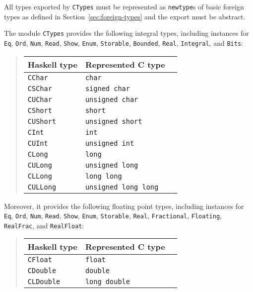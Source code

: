 \documentclass[a4paper,twoside]{article}
\newcommand{\code}[1]{\texttt{#1}}      %
\begin{document}
%
All types exported by \code{CTypes} must be represented as \code{newtype}s of
basic foreign types as defined in Section~\ref{sec:foreign-types} and the
export must be abstract.

The module \code{CTypes} provides the following integral types, including
instances for \code{Eq}, \code{Ord}, \code{Num}, \code{Read}, \code{Show},
\code{Enum}, \code{Storable}, \code{Bounded}, \code{Real}, \code{Integral},
and \code{Bits}:
%
\begin{quote}
  \begin{tabular}{|l|l|l|}
    \hline
    Haskell type     & Represented C type\\\hline\hline
    \code{CChar}     & \code{char}\\\hline
    \code{CSChar}    & \code{signed char}\\\hline
    \code{CUChar}    & \code{unsigned char}\\\hline
    \code{CShort}    & \code{short}\\\hline
    \code{CUShort}   & \code{unsigned short}\\\hline
    \code{CInt}      & \code{int}\\\hline
    \code{CUInt}     & \code{unsigned int}\\\hline
    \code{CLong}     & \code{long}\\\hline
    \code{CULong}    & \code{unsigned long}\\\hline
    \code{CLLong}    & \code{long long}\\\hline
    \code{CULLong}   & \code{unsigned long long}\\\hline
  \end{tabular}
\end{quote}
%
Moreover, it provides the following floating point types, including instances
for \code{Eq}, \code{Ord}, \code{Num}, \code{Read}, \code{Show}, \code{Enum},
\code{Storable}, \code{Real}, \code{Fractional}, \code{Floating},
\code{RealFrac}, and \code{RealFloat}:
%
\begin{quote}
  \begin{tabular}{|l|l|l|}
    \hline
    Haskell type     & Represented C type\\\hline\hline
    \code{CFloat}    & \code{float}\\\hline
    \code{CDouble}   & \code{double}\\\hline
    \code{CLDouble}  & \code{long double}\\\hline
  \end{tabular}
\end{quote}
\end{document}
